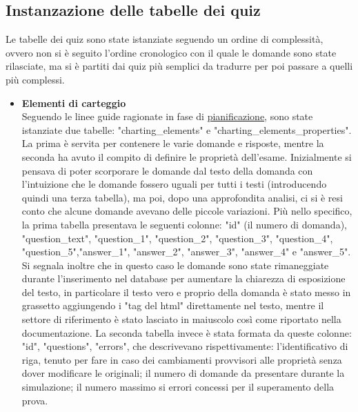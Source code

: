 \subsection{Instanzazione delle tabelle dei quiz}
\raggedright
Le tabelle dei quiz sono state istanziate seguendo un ordine di complessità, ovvero non si è seguito l'ordine cronologico con il quale le domande sono state rilasciate, ma si è partiti dai quiz più semplici da tradurre per poi passare a quelli più complessi.\\
\begin{itemize}
	\item \textbf{Elementi di carteggio}\\
	Seguendo le linee guide ragionate in fase di  \hyperref[cap:Introduzione]{pianificazione}, sono state istanziate due tabelle: "charting\_elements" e  "charting\_elements\_properties". La prima è servita per contenere le varie domande e risposte, mentre la seconda ha avuto il compito di definire le proprietà dell'esame. Inizialmente si pensava di poter scorporare le domande dal testo della domanda con l'intuizione che le domande fossero uguali per tutti i testi (introducendo quindi una terza tabella), ma poi, dopo una approfondita analisi, ci si è resi conto che alcune domande avevano delle piccole variazioni. 
	Più nello specifico, la prima tabella presentava le seguenti colonne: "id" (il numero di domanda), "question\_text", "question\_1", "question\_2", "question\_3", "question\_4", "question\_5","answer\_1", "answer\_2", "answer\_3", "answer\_4" e "answer\_5". Si segnala inoltre che in questo caso le domande sono state rimaneggiate durante l'inserimento nel database per aumentare la chiarezza di esposizione del testo, in particolare il testo vero e proprio della domanda è stato messo in grassetto aggiungendo i "tag del html" direttamente nel testo, mentre il settore di riferimento è stato lasciato in maiuscolo così come riportato nella documentazione. La seconda tabella invece è stata formata da queste colonne: "id", "questions", "errors", che descrivevano rispettivamente: l'identificativo di riga, tenuto per fare in caso dei cambiamenti provvisori alle proprietà senza dover modificare le originali; il numero di domande da presentare durante la simulazione; il numero massimo si errori concessi per il superamento della prova. 
	

\end{itemize}
